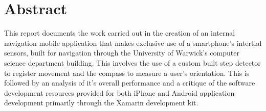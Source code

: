 \documentclass[main.tex]{subfiles}
\begin{document}
\section{Abstract}

This report documents the work carried out in the creation of an internal navigation mobile application that makes exclusive use of a smartphone's intertial sensors, built for navigation through the University of Warwick's computer science department building. This involves the use of a custom built step detector to register movement and the compass to measure a user's orientation. This is followed by an analysis of it's overall performance and a critique of the software development resources provided for both iPhone and Android application development primarily through the Xamarin development kit.
\end{document}
